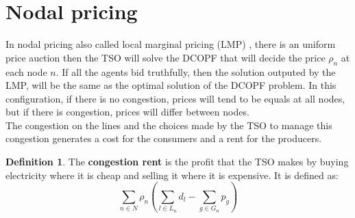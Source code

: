 \documentclass[12pt, openany]{report}
\theoremstyle{definition}
\newtheorem{definition}[thm]{Definition}
\begin{document}
\section{Nodal pricing}
In nodal pricing also called local marginal pricing (LMP) , there is an uniform price auction then the TSO will solve the DCOPF that will decide the price $\rho_n$ at each node $n$. If all the agents bid truthfully, then the solution outputed by the LMP, will be the same as the optimal solution of the DCOPF problem. In this configuration, if there is no congestion, prices will tend to be equals at all nodes, but if there is congestion, prices will differ between nodes.\\
The congestion on the lines and the choices made by the TSO to manage this congestion generates a cost for the consumers and a rent for the producers. 
\begin{definition}
    The \textbf{congestion rent} is the profit that the TSO makes by buying electricity where it is cheap and selling it where it is expensive. It is defined as: 
    \begin{equation}
        \sum_{n \in N} \rho_n \left(\sum_{l \in L_n} d_l - \sum_{g \in G_n} p_g\right)
    \end{equation}
\end{definition}
\end{document}
